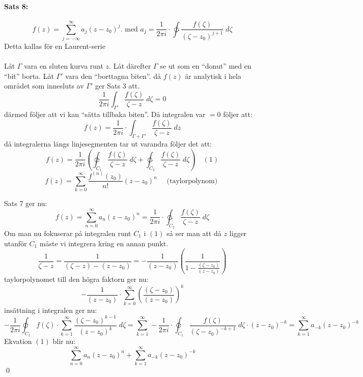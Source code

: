 \documentclass{article}
\begin{document}
\paragraph{Sats 8:}
\[
	f(z) = \sum_{j = - \infty}^\infty a_j (z - z_0)^j. \text{ med } a_j = \frac {1} {2 \pi i} \cdot \ointctrclockwise
		\frac {f(\zeta)} {(\zeta - z_0)^{j + 1}} \; d\zeta
\]
Detta kallas för en Laurent-serie\\
\\
Låt $\Gamma$ vara en sluten kurva runt $z$.
Låt därefter $\Gamma$ se ut som en ``donut'' med en ``bit'' borta.
Låt $\Gamma'$ vara den ``borttagna biten''. då $f(z)$ är analytisk i hela området som innesluts av $\Gamma'$ ger Sats 3 att.
\[
	\frac {1} {2 \pi i} \int_{\Gamma'} \frac {f(\zeta)} {\zeta - z} \; d\zeta = 0
\]
därmed följer att vi kan ``sätta tillbaka biten''. Då integralen var $= 0$ följer att:
\[
	f(z) = \frac {1} {2 \pi i} \cdot \int_{\Gamma + \Gamma'} \frac {f(\zeta)} {\zeta - z} \; dz
\]
då integralerna längs linjesegmenten tar ut varandra följer det att:
\[
	f(z) = \frac {1} {2 \pi i} \left ( \varointclockwise_{C_1} \frac {f(\zeta)} {\zeta - z} \; d\zeta + 
		\ointctrclockwise_{C_2} \frac {f(\zeta)} {\zeta - z} \; d\zeta \right ) \quad (1)
\]
\[
	f(z) = \sum_{k = 0}^\infty \frac {f^{(n)}(z_0)} {n!} (z - z_0)^n \quad \text{ (taylorpolynom) }
\]

Sats 7 ger nu:
\[
	f(z) = \sum_{n = 0}^\infty a_n (z - z_0)^n = \frac {1} {2 \pi i} \cdot \ointctrclockwise_{C_2} \frac 
		{f(\zeta)} {\zeta - z} \; d\zeta
\]
Om man nu fokuserar på integralen runt $C_1$ i $(1)$ så ser man att då $z$ ligger utanför $C_1$ 
måste vi integrera kring en annan punkt.
\[
	\frac {1} {\zeta - z} = \frac {1} {(\zeta - z) - (z - z_0)} = - \frac {1} {(z - z_0)}
		\left (
			\frac {1} {1 - \frac {(\zeta - z_0)} {(z - z_0)}}
		\right )
\]
taylorpolynomet till den högra faktorn ger nu:
\[
	- \frac {1} {(z - z_0)} \cdot \sum_{k = 0}^\infty
		\left (
			\frac {(\zeta - z_0)} {(z - z_0)}
		\right )^k
\]
insättning i integralen ger nu:
\[ %
	- \frac {1} {2 \pi i} \varointclockwise_{C_1} f(\zeta) \cdot \sum_{k = 1}^\infty \frac {(\zeta - z_0)^{k - 1}} {(z - z_0)^k} \; d\zeta
	= \sum_{k = 1}^\infty -\frac{1} {2 \pi i} \cdot \varointclockwise_{C_1} \frac {f(\zeta)} {(\zeta - z_0)^{-k + 1}} \; d\zeta \cdot
			(z - z_0)^{-k} = \sum_{k = 1}^\infty a_{-k} (z - z_0)^{-k}
\] %
Ekvation $(1)$ blir nu:
\[
	\sum_{n = 0}^\infty a_n(z - z_0)^n + \sum_{k = 1}^\infty a_{-k}(z - z_0)^{-k}
\]
\hfill \qed
\end{document}
